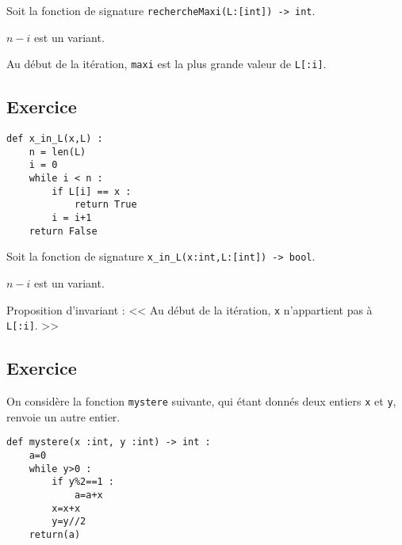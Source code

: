 Soit la fonction de signature \lstinline{rechercheMaxi(L:[int]) -> int}.

\ifprof
\begin{corrige}
$n-i$ est un variant.
\end{corrige}
\else
\fi

\ifprof
\begin{corrige}
Au début de la \ieme itération, \texttt{maxi} est la plus grande valeur de \texttt{L[:i]}. 
\end{corrige}
\else
\fi

\subsection*{Exercice}

\begin{marginfigure}
\begin{lstlisting}
def x_in_L(x,L) :
    n = len(L)
    i = 0
    while i < n :
        if L[i] == x :
            return True
        i = i+1
    return False
\end{lstlisting}
\end{marginfigure}

Soit la fonction de signature \lstinline{x_in_L(x:int,L:[int]) -> bool}.

\ifprof
\begin{corrige}
$n-i$ est un variant.
\end{corrige}
\else
\fi

\ifprof
\begin{corrige}
Proposition d'invariant : << Au début de la \ieme itération, \texttt{x} n'appartient pas à \texttt{L[:i]}. >>
\end{corrige}
\else
\fi



\subsection*{Exercice}

On considère la fonction \texttt{mystere} suivante, qui étant donnés deux entiers \texttt{x} et \texttt{y}, renvoie un autre
entier.
\begin{lstlisting}
def mystere(x :int, y :int) -> int :
    a=0
    while y>0 :
        if y%2==1 :
            a=a+x
        x=x+x
        y=y//2
    return(a)
\end{lstlisting}

